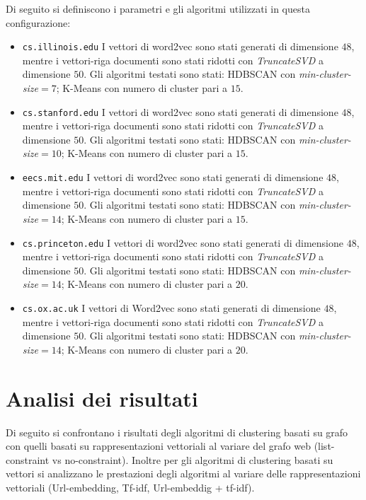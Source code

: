 Di seguito si definiscono i parametri e gli algoritmi utilizzati in questa configurazione:
\begin{itemize}
\item \texttt{cs.illinois.edu} I vettori di word2vec sono stati generati di dimensione $48$, mentre i vettori-riga documenti sono stati ridotti con \textit{TruncateSVD} a dimensione $50$. Gli algoritmi testati sono stati: HDBSCAN con \textit{min-cluster-size}$=7$; K-Means con numero di cluster pari a $15$.
\item \texttt{cs.stanford.edu} I vettori di word2vec sono stati generati di dimensione $48$, mentre i vettori-riga documenti sono stati ridotti con \textit{TruncateSVD} a dimensione $50$. Gli algoritmi testati sono stati: HDBSCAN con \textit{min-cluster-size}$=10$; K-Means con numero di cluster pari a $15$. 
\item \texttt{eecs.mit.edu} I vettori di word2vec sono stati generati di dimensione $48$, mentre i vettori-riga documenti sono stati ridotti con \textit{TruncateSVD} a dimensione $50$. Gli algoritmi testati sono stati: HDBSCAN con \textit{min-cluster-size}$=14$; K-Means con numero di cluster pari a $15$. 
\item \texttt{cs.princeton.edu} I vettori di word2vec sono stati generati di dimensione $48$, mentre i vettori-riga documenti sono stati ridotti con \textit{TruncateSVD} a dimensione $50$. Gli algoritmi testati sono stati: HDBSCAN con \textit{min-cluster-size}$=14$; K-Means con numero di cluster pari a $20$. 
\item \texttt{cs.ox.ac.uk} I vettori di Word2vec sono stati generati di dimensione $48$, mentre i vettori-riga documenti sono stati ridotti con \textit{TruncateSVD} a dimensione $50$. Gli algoritmi testati sono stati: HDBSCAN con \textit{min-cluster-size}$=14$; K-Means con numero di cluster pari a $20$.
\end{itemize}

\section{Analisi dei risultati}
Di seguito si confrontano i risultati degli algoritmi di clustering basati su grafo con quelli basati su rappresentazioni vettoriali al variare del grafo web (list-constraint vs no-constraint).
Inoltre per gli algoritmi di clustering basati su vettori si analizzano le prestazioni degli algoritmi al variare delle rappresentazioni vettoriali (Url-embedding, Tf-idf, Url-embeddig + tf-idf).

